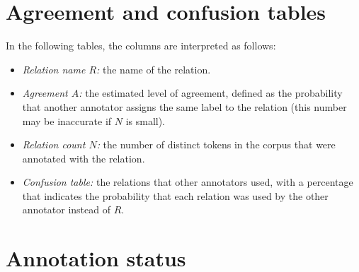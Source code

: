 \documentclass[11pt]{report}
\begin{document}
	

	\chapter{Agreement and confusion tables}

	In the following tables, the columns are interpreted as follows:
	\begin{itemize}
		\item \textit{Relation name $R$:} the name of the relation.
		\item \textit{Agreement $A$:} the estimated level of agreement, defined
			as the probability that another annotator assigns the same
			label to the relation (this number may be inaccurate if
			$N$ is small).
		\item \textit{Relation count $N$:} the number of distinct
			tokens in the corpus that were annotated with the relation.
		\item \textit{Confusion table:} the relations that other
			annotators used, with a percentage that indicates the
			probability that each relation was used by the other annotator 
			instead of $R$.
	\end{itemize}

	
	
	
	

	\chapter{Annotation status}

	

	\printindex
\end{document}
